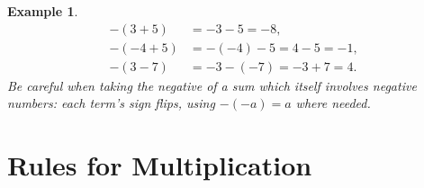 \documentclass[11pt]{article}
\newtheorem{example}{Example}[section]
\begin{document}
\begin{example}
  \begin{align*}
    -(3 + 5)  &= -3 - 5 = -8, \\
    -(-4 + 5) &= -(-4) - 5 = 4 - 5 = -1, \\
    -(3 - 7)  &= -3 - (-7) = -3 + 7 = 4.
  \end{align*}
  Be careful when taking the negative of a sum which itself involves
  negative numbers: each term's sign flips, using $-(-a) = a$ where
  needed.
\end{example}

\section{Rules for Multiplication}
\end{document}
